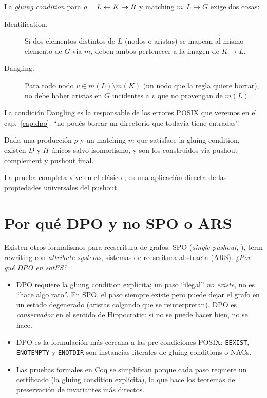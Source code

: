 \begin{defn}
\label{def:gluing-prelim}
La \emph{gluing condition} para $\rho = L \leftarrow K \rightarrow R$ y matching $m: L
\to G$ exige dos cosas:
\begin{description}
  \item[\textsf{Identification.}] Si dos elementos distintos de $L$
    (nodos o aristas) se mapean al mismo elemento de $G$ vía $m$,
    deben ambos pertenecer a la imagen de $K \to L$.
  \item[\textsf{Dangling.}] Para todo nodo $v \in m(L) \setminus
    m(K)$ (un nodo que la regla quiere borrar), no debe haber aristas
    en $G$ incidentes a $v$ que no provengan de $m(L)$.
\end{description}
La condición Dangling es la responsable de los errores POSIX que
veremos en el cap.~\ref{cap:dpo}: ``no podés borrar un directorio que
todavía tiene entradas''.
\end{defn}

\begin{teorema}
\label{teo:dpo-existencia}
Dada una producción $\rho$ y un matching $m$ que satisface la gluing
condition, existen $D$ y $H$ únicos salvo isomorfismo, y son los
construidos vía pushout complement y pushout final.
\end{teorema}

La prueba completa vive en el clásico \cite{Ehrig2006}; es una
aplicación directa de las propiedades universales del pushout.

\section{Por qué DPO y no SPO o ARS}

Existen otros formalismos para reescritura de grafos: SPO
(\emph{single-pushout}, \cite{Corradini2006}), term rewriting con
\emph{attribute systems}, sistemas de reescritura abstracta (ARS).
\emph{¿Por qué DPO en sotFS?}

\begin{itemize}
  \item DPO requiere la gluing condition explícita; un paso ``ilegal''
    \emph{no existe}, no es ``hace algo raro''. En SPO, el paso siempre
    existe pero puede dejar el grafo en un estado degenerado (aristas
    colgando que se reinterpretan). DPO es \emph{conservador} en el
    sentido de Hippocratic: si no se puede hacer bien, no se hace.
  \item DPO es la formulación más cercana a las pre-condiciones POSIX:
    \texttt{EEXIST}, \texttt{ENOTEMPTY} y \texttt{ENOTDIR} son
    instancias literales de gluing conditions o NACs.
  \item Las pruebas formales en Coq se simplifican porque cada paso
    requiere un certificado (la gluing condition explícita), lo que
    hace los teoremas de preservación de invariantes más directos.
\end{itemize}

